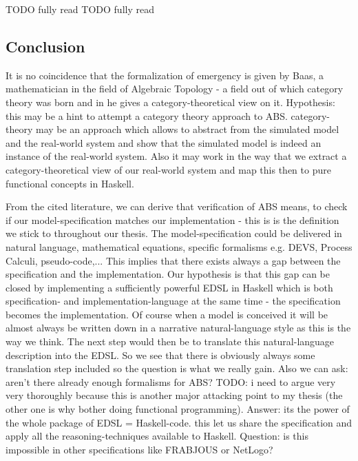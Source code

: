 TODO fully read \cite{epstein_generative_2012}
TODO fully read \cite{epstein_chapter_2006}

\subsection{Conclusion}
It is no coincidence that the formalization of emergency is given by Baas, a mathematician in the field of Algebraic Topology - a field out of which category theory was born and in \cite{baas_emergence_1997} he gives a category-theoretical view on it.
Hypothesis: this may be a hint to attempt a category theory approach to ABS. category-theory may be an approach which allows to abstract from the simulated model and the real-world system and show that the simulated model is indeed an instance of the real-world system. Also it may work in the way that we extract a category-theoretical view of our real-world system and map this then to pure functional concepts in Haskell.

From the cited literature, we can derive that verification of ABS means, to check if our model-specification matches our implementation - this is is the definition we stick to throughout our thesis. The model-specification could be delivered in natural language, mathematical equations, specific formalisms e.g. DEVS, Process Calculi, pseudo-code,... This implies that there exists always a gap between the specification and the implementation. Our hypothesis is that this gap can be closed by implementing a sufficiently powerful EDSL in Haskell which is both specification- and implementation-language at the same time - the specification becomes the implementation. Of course when a model is conceived it will be almost always be written down in a narrative natural-language style as this is the way we think. The next step would then be to translate this natural-language description into the EDSL. So we see that there is obviously always some translation step included so the question is what we really gain. Also we can ask: aren't there already enough formalisms for ABS? TODO: i need to argue very very thoroughly because this is another major attacking point to my thesis (the other one is why bother doing functional programming).
Answer: its the power of the whole package of EDSL = Haskell-code. this let us share the specification and apply all the reasoning-techniques available to Haskell. Question: is this impossible in other specifications like FRABJOUS or NetLogo?

